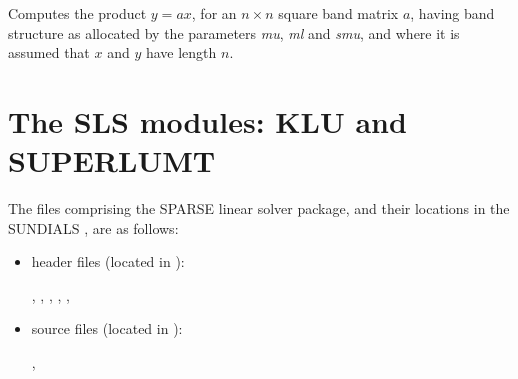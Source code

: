 \documentclass[letterpaper,10pt,english]{sphinxmanual}
\begin{document}
\begin{fulllineitems}
\label{linear_solvers/DLS:bandMatvec}
Computes the product $y = ax$, for an $n\times n$
square band matrix $a$, having band structure as allocated by
the parameters \emph{mu}, \emph{ml} and \emph{smu}, and where it is assumed that
$x$ and $y$ have length $n$.

\end{fulllineitems}



\section{The SLS modules: KLU and SUPERLUMT}
\label{linear_solvers/SLS::doc}\label{linear_solvers/SLS:the-sls-modules-klu-and-superlumt}\label{linear_solvers/SLS:linearsolvers-sls}
The files comprising the SPARSE linear solver package, and their
locations in the SUNDIALS , are as follows:
\begin{itemize}
\item {} 
header files (located in ):

, ,
, ,
, 

\item {} 
source files (located in ):

, 

\end{itemize}
\end{document}
